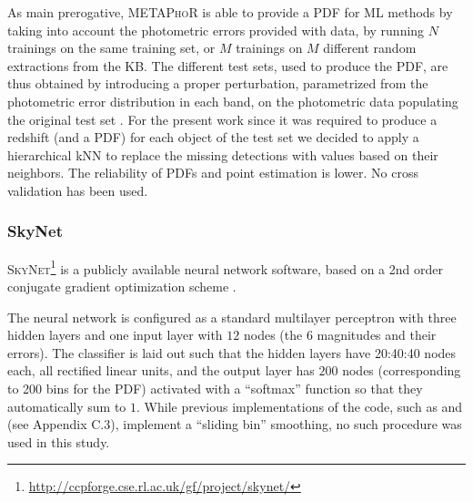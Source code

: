 
As main prerogative, \textsc{METAPhoR} is able to provide a PDF for ML methods by taking into account the photometric errors provided with data, by running $N$ trainings on the same training set, or $M$ trainings on $M$ different random extractions from the KB.
The different test sets, used to produce the PDF, are thus obtained by introducing a proper perturbation, parametrized from the photometric error distribution in each band, on the photometric data populating the original test set \citep{Brescia:18}.
For the present work since it was required to produce a redshift (and a PDF) for each object of the test set we decided to apply a hierarchical kNN to replace the missing detections with values based on their neighbors.
The reliability of PDFs and point estimation is lower. No cross validation has been used.

\subsubsection{SkyNet}
\label{sec:skynet}

\textsc{SkyNet}\footnote{\url{http://ccpforge.cse.rl.ac.uk/gf/project/skynet/}} \citep{Graff:14} is a publicly available neural network software, based on a 2nd order conjugate gradient optimization scheme \citep[see][for further details]{Graff:14}. %

The neural network is configured as a standard multilayer perceptron with three hidden layers and one input layer with $12$ nodes (the $6$ magnitudes and their errors).
The classifier is laid out such that the hidden layers have 20:40:40 nodes each, all rectified linear units, and the output layer has $200$ nodes (corresponding to 200 bins for the PDF) activated with a ``softmax'' function so that they automatically sum to $1$.
While previous implementations of the code, such as \citet{Sanchez:14} and \citet{Bonnett:15} (see Appendix C.3), implement a ``sliding bin'' smoothing, no such procedure was used in this study.

